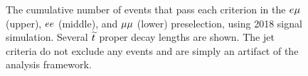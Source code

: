 \begin{figure}[hbtp]
\caption{The cumulative number of events that pass each criterion in the $e{\mu}$ (upper), $ee$ (middle), and ${\mu}{\mu}$ (lower) preselection, using 2018 signal simulation. Several $\widetilde{t}$ proper decay lengths are shown. The jet criteria do not exclude any events and are simply an artifact of the analysis framework.}
\label{fig:Cutflow_Signal_severalLifetimes}
\end{figure}
